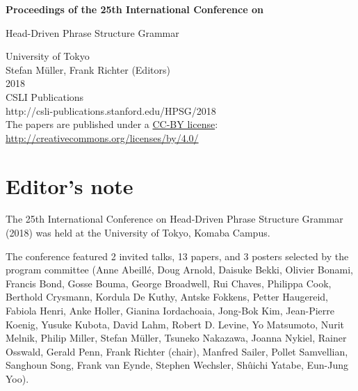 \documentclass[11pt,a4paper,fleqn]{article}
\begin{document}
\begin{center}
{\Large
                {\bfseries Proceedings of the 25th International Conference on\par Head-Driven Phrase Structure Grammar\par}

                \vspace{8ex}

                     University of Tokyo\\[\baselineskip]

                        Stefan  M{\"u}ller, Frank Richter (Editors)\\[\baselineskip]

                                2018\\[\baselineskip]

                          CSLI Publications\\[\baselineskip]

              http://csli-publications.stanford.edu/HPSG/2018 \\[4\baselineskip]

The papers are published under a \href{http://creativecommons.org/licenses/by/4.0/}{CC-BY license}:\\[3pt]
\href{http://creativecommons.org/licenses/by/4.0/}{http://creativecommons.org/licenses/by/4.0/}
}
\end{center}
\newpage
\tableofcontents

\newpage

\section*{Editor's note}
The 25th International Conference on Head-Driven Phrase Structure Grammar (2018) was held at
the University of Tokyo, Komaba Campus.

The conference featured 2 invited talks, 13 papers, and 3 posters selected by the program committee 
(Anne Abeillé,
Doug Arnold,
Daisuke Bekki,
Olivier Bonami,
Francis Bond,
Gosse Bouma,
George Broadwell,
Rui Chaves,
Philippa Cook,
Berthold Crysmann,
Kordula De Kuthy,
Antske Fokkens,
Petter Haugereid,
Fabiola Henri,
Anke Holler,
Gianina Iordachoaia,
Jong-Bok Kim,
Jean-Pierre Koe\-nig,
Yusuke Kubota,
David Lahm,
Robert D. Levine,
Yo Matsumoto,
Nurit Melnik,
Philip Miller,
Stefan Müller,
Tsuneko Nakazawa,
Joanna Nykiel,
Rainer Osswald,
Gerald Penn,
Frank Richter (chair),
Manfred Sailer,
Pollet Samvellian,
Sanghoun Song,
Frank van Eynde,
Stephen Wechsler,
Shûichi Yatabe,
Eun-Jung Yoo).
\end{document}
